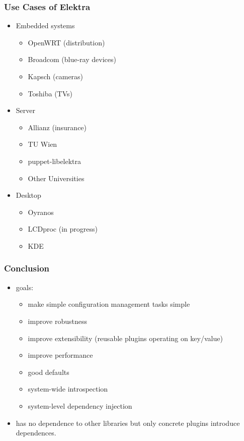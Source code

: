 \begin{frame}
	\frametitle{Use Cases of Elektra}
	\begin{itemize}[<+->]
	\item Embedded systems
	\begin{itemize}
	\item OpenWRT (distribution)
	\item Broadcom (blue-ray devices)
	\item Kapsch (cameras)
	\item Toshiba (TVs)
	\end{itemize}
	\item Server
	\begin{itemize}
	\item Allianz (insurance)
	\item TU Wien
	\item puppet-libelektra
	\item Other Universities
	\end{itemize}
	\item Desktop
	\begin{itemize}
	\item Oyranos
	\item LCDproc (in progress)
	\item KDE
	\end{itemize}
	\end{itemize}
\end{frame}

\begin{frame}
	\frametitle{Conclusion}
	\begin{itemize}
	\item goals:
		\begin{itemize}
		\item make simple configuration management tasks simple
		\item improve robustness
		\item improve extensibility (reusable plugins operating on key/value)
		\item improve performance
		\item good defaults
		\item system-wide introspection
		\item system-level dependency injection
		\end{itemize}
	\item \elektra{} has no dependence to other libraries but only concrete plugins introduce dependences.
	\end{itemize}
\end{frame}




